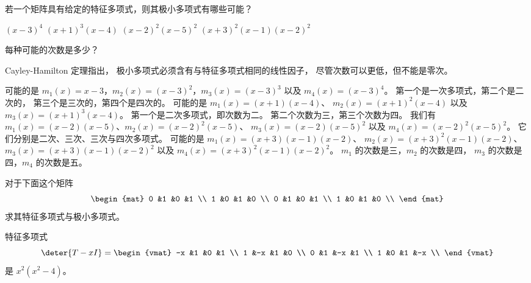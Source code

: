 \begin{exercises}
  \recommended \item 
    若一个矩阵具有给定的特征多项式，则其极小多项式有哪些可能？
    \begin{exparts*}
      \partsitem $(x-3)^4$
      \partsitem $(x+1)^3(x-4)$
      \partsitem $(x-2)^2(x-5)^2$
      \partsitem  \( (x+3)^2(x-1)(x-2)^2 \)
    \end{exparts*}
    每种可能的次数是多少？
    \begin{answer} 
      Cayley-Hamilton 定理指出，
      极小多项式必须含有与特征多项式相同的线性因子，
      尽管次数可以更低，但不能是零次。
      \begin{exparts}
        \partsitem 可能的是
          $m_1(x)=x-3$，$m_2(x)=(x-3)^2$，$m_3(x)=(x-3)^3$
          以及 $m_4(x)=(x-3)^4$。
          第一个是一次多项式，第二个是二次的，
          第三个是三次的，第四个是四次的。
        \partsitem 可能的是 $m_1(x)=(x+1)(x-4)$、
          $m_2(x)=(x+1)^2(x-4)$ 以及 $m_3(x)=(x+1)^3(x-4)$。
          第一个是二次多项式，即次数为二。
          第二个次数为三，第三个次数为四。
        \partsitem 我们有 $m_1(x)=(x-2)(x-5)$、$m_2(x)=(x-2)^2(x-5)$、
          $m_3(x)=(x-2)(x-5)^2$ 以及 $m_4(x)=(x-2)^2(x-5)^2$。
          它们分别是二次、三次、三次与四次多项式。
        \partsitem 可能的是 \( m_1(x)=(x+3)(x-1)(x-2) \)、
          \( m_2(x)=(x+3)^2(x-1)(x-2) \)、
          \( m_3(x)=(x+3)(x-1)(x-2)^2 \)
          以及 \( m_4(x)=(x+3)^2(x-1)(x-2)^2 \)。
          $m_1$ 的次数是三，$m_2$ 的次数是四，
          $m_3$ 的次数是四，$m_4$ 的次数是五。
      \end{exparts}
    \end{answer}
  \item 对于下面这个矩阵
    \begin{equation*}
      \begin{mat}
        0 &1 &0 &1 \\
        1 &0 &1 &0 \\
        0 &1 &0 &1 \\
        1 &0 &1 &0 \\
      \end{mat}
    \end{equation*}
    求其特征多项式与极小多项式。
    \begin{answer}
    特征多项式
    \begin{equation*}
      \deter{T-xI}=
      \begin{vmat}
        -x &1  &0  &1 \\
         1 &-x &1  &0 \\
         0 &1  &-x &1 \\
         1 &0  &1  &-x \\
      \end{vmat}
    \end{equation*}
    是 $x^2(x^2-4)$。


\end{answer}
\end{exercises}

